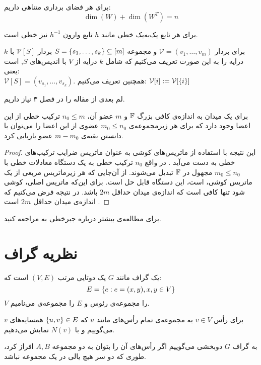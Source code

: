 \begin{theorem}
	برای هر فضای برداری متناهی داریم:
	$$\dim(W) + \dim(W^T) = n$$
\end{theorem}
\begin{remark}
	برای هر تابع یک‌به‌یک خطی مانند
	$h$
	تابع وارون 
	$h^{-1}$
	نیز خطی است.
\end{remark}
\begin{notation}
برای بردار
$\mathcal{V} = (v_1, \ldots, v_m)$ 
و مجموعه
$S = \left\{ s_1, \ldots, s_k \right\} \subseteq [m]$
بردار
$\mathcal{V} [S]$ 
با 
$k$ درایه 
را به این صورت تعریف می‌کنیم که شامل
$k$ 
درایه از
$V$ 
با اندیس‌های
$S$, 
است یعنی:\\
$\mathcal{V} [S] = (v_{s_1}, \ldots, v_{s_k})$.
همچنین تعریف می‌کنیم:
$\mathcal{V} [i] := \mathcal{V} [{\left\{ i \right\}}]$
\end{notation}

لم بعدی از مقاله
\cite{pliable2015paper}
را در فصل ۳ نیاز داریم.
\begin{lemma}
	\label{lemma:pliable20151}
	برای یک میدان به اندازه‌ی کافی بزرگ
	$\mathbb{F}$
	و
	$m$
	عضو آن،
	$n_0 \leq m$
	ترکیب خطی از این اعضا وجود دارد که برای هر زیرمجموعه‌ی
	$m_0 \leq n_0$
	عضوی از این اعضا را می‌توان با دانستن بقیه‌ی
	$m - m_0$
	عضو بازیابی کرد.
\end{lemma}
\begin{proof}
این نتیجه با استفاده از ماتریس‌های کوشی به عنوان ماتریس ضرایب ترکیب‌های خطی به دست می‌آید
\cite{Blmer1995AnXE}.
در واقع
$n_0$
ترکیب خطی به یک دستگاه معادلات خطی با
$m_0 \leq n_0$
مجهول در
$\mathbb{F}$
تبدیل می‌شوند. از آن‌جایی که هر زیرماتریس مربعی از یک ماتریس کوشی، 
است، این دستگاه قابل حل است. برای این‌که ماتریس اصلی، کوشی شود تنها کافی است که اندازه‌ی میدان حداقل
$2m$
باشد. در نتیجه فرض می‌کنیم که اندازه‌ی میدان حداقل
$2m$
است
\cite{pliable2015paper}.
\end{proof}
	برای مطالعه‌ی بیشتر درباره جبرخطی به
\cite{sheldon}
مراجعه کنید.
\section{نظریه گراف}
\begin{definition}[گراف]
یک گراف مانند
$G$
یک دوتایی مرتب
$(V, E)$
است که:
$$E = \left\{ e: e = (x, y), x, y \in V \right\}$$
 $V$
را مجموعه‌ی رئوس و
$E$
را مجموعه‌ی 
می‌نامیم.
\end{definition}
\begin{definition}[همسایه]
برای رأس
$v\in V$
به مجمو‌عه‌ی تمام رأس‌های مانند
  $u$ 
  که
  $\left\{ u,v \right\}\in E$
  همسایه‌های 
  $v$
  می‌گوییم و با
  $N(v)$
  نمایش می‌دهیم.
  \end{definition}
  \begin{definition}
  
به گراف
$G$
دوبخشی می‌گوییم اگر رأس‌های آن را بتوان به دو مجموعه
$A, B$
افراز کرد، طوری که دو سر هیچ یالی در یک مجموعه نباشد.
\end{definition}


